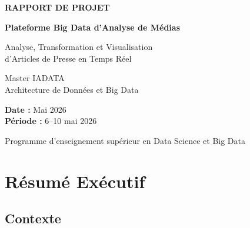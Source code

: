 \documentclass[12pt,a4paper]{report}
\begin{document}
\begin{titlepage}
    \centering
    \vspace*{2cm}

    {\Large\bfseries\color{darkblue}
        RAPPORT DE PROJET
    }

    \vspace{1.5cm}

    {\LARGE\bfseries
        Plateforme Big Data d'Analyse de Médias
    }

    \vspace{0.5cm}

    {\Large
        Analyse, Transformation et Visualisation\\
        d'Articles de Presse en Temps Réel
    }

    \vspace{3cm}

    {\large
        Master IADATA\\
        Architecture de Données et Big Data\\
    }

    \vspace{2cm}

    {\large
        \textbf{Date :} Mai 2026\\
        \textbf{Période :} 6--10 mai 2026\\
    }

    \vfill

    {\large
        Programme d'enseignement supérieur en Data Science et Big Data
    }

\end{titlepage}

\newpage
\thispagestyle{empty}
\mbox{}

\newpage
\tableofcontents

\chapter*{Résumé Exécutif}

\section*{Contexte}
\end{document}
